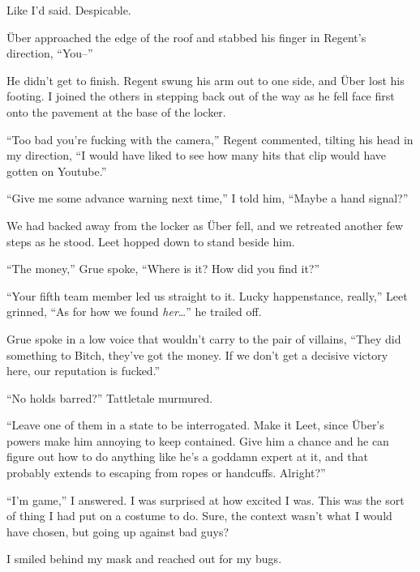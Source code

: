 Like I'd said.  Despicable.



\"{U}ber approached the edge of the roof and stabbed his finger in Regent's direction, ``You--''



He didn't get to finish.  Regent swung his arm out to one side, and \"{U}ber lost his footing.  I joined the others in stepping back out of the way as he fell face first onto the pavement at the base of the locker.



``Too bad you're fucking with the camera,'' Regent commented, tilting his head in my direction, ``I would have liked to see how many hits that clip would have gotten on Youtube.''



``Give me some advance warning next time,'' I told him, ``Maybe a hand signal?''



We had backed away from the locker as \"{U}ber fell, and we retreated another few steps as he stood.  Leet hopped down to stand beside him.



``The money,'' Grue spoke, ``Where is it?  How did you find it?''



``Your fifth team member led us straight to it.  Lucky happenstance, really,'' Leet grinned, ``As for how we found \emph{her}\ldots'' he trailed off.



Grue spoke in a low voice that wouldn't carry to the pair of villains, ``They did something to Bitch, they've got the money.  If we don't get a decisive victory here, our reputation is fucked.''



``No holds barred?'' Tattletale murmured.



``Leave one of them in a state to be interrogated.  Make it Leet, since \"{U}ber's powers make him annoying to keep contained.  Give him a chance and he can figure out how to do anything like he's a goddamn expert at it, and that probably extends to escaping from ropes or handcuffs.  Alright?''



``I'm game,'' I answered.  I was surprised at how excited I was.  This was the sort of thing I had put on a costume to do.  Sure, the context wasn't what I would have chosen, but going up against bad guys?



I smiled behind my mask and reached out for my bugs.





